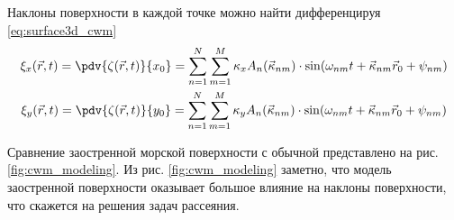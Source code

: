 Наклоны поверхности в каждой точке можно найти дифференцируя
\eqref{eq:surface3d_cwm} 
\begin{equation}
    \begin{gathered}
        \xi_{x}(\vec r,t) = \pdv{\zeta(\vec r,t)}{x_0} = \fullsum \kappa_{x} A_n(\vec \kappa_{nm}) \cdot \sin(\fullphase)    \\
        \xi_{y}(\vec r,t) = \pdv{\zeta(\vec r,t)}{y_0} = \fullsum  \kappa_{y} A_n(\vec \kappa_{nm}) \cdot \sin(\fullphase)    \\
    \end{gathered}
\end{equation}


Сравнение заостренной морской поверхности с обычной представлено на рис.
\ref{fig:cwm_modeling}. Из рис. \ref{fig:cwm_modeling} заметно, что модель
заостренной поверхности оказывает большое влияние на наклоны поверхности, что
скажется на решения задач рассеяния.







